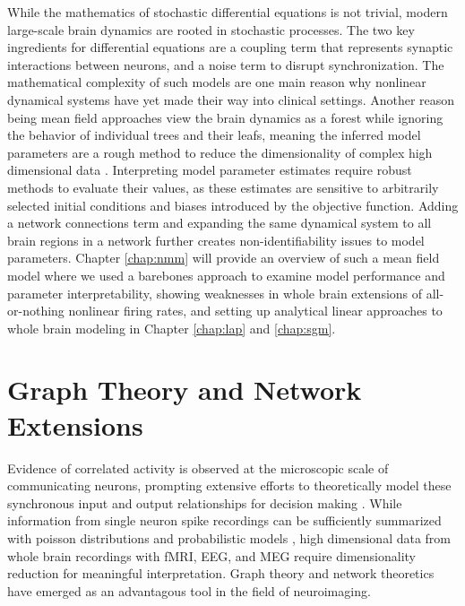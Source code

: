 While the mathematics of stochastic differential equations is not trivial, modern large-scale brain dynamics are rooted in stochastic processes. The two key ingredients for differential equations are a coupling term that represents synaptic interactions between neurons, and a noise term to disrupt synchronization. The mathematical complexity of such models are one main reason why nonlinear dynamical systems have yet made their way into clinical settings. Another reason being mean field approaches view the brain dynamics as a forest while ignoring the behavior of individual trees and their leafs, meaning the inferred model parameters are a rough method to reduce the dimensionality of complex high dimensional data \cite{huys_computational_2016}. Interpreting model parameter estimates require robust methods to evaluate their values, as these estimates are sensitive to arbitrarily selected initial conditions and biases introduced by the objective function. Adding a network connections term and expanding the same dynamical system to all brain regions in a network further creates non-identifiability issues to model parameters. Chapter \ref{chap:nmm} will provide an overview of such a mean field model where we used a barebones approach to examine model performance and parameter interpretability, showing weaknesses in whole brain extensions of all-or-nothing nonlinear firing rates, and setting up analytical linear approaches to whole brain modeling in Chapter \ref{chap:lap} and \ref{chap:sgm}. 

\section{Graph Theory and Network Extensions}
Evidence of correlated activity is observed at the microscopic scale of communicating neurons, prompting extensive efforts to theoretically model these synchronous input and output relationships for decision making \cite{bogacz_physics_2006,hamburger_donald_1969,ratcliff_diffusion_2008,ratcliff_connectionist_1999}. While information from single neuron spike recordings can be sufficiently summarized with poisson distributions and probabilistic models \cite{smith_poisson_2010,zhang_optimal_2010}, high dimensional data from whole brain recordings with fMRI, EEG, and MEG require dimensionality reduction for meaningful interpretation. Graph theory and network theoretics have emerged as an advantagous tool in the field of neuroimaging.

